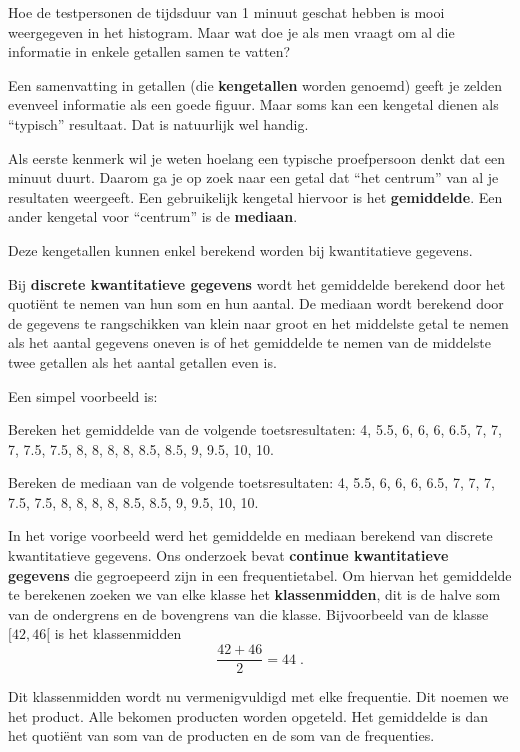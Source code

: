\documentclass[12pt,twoside]{article}
\begin{document}
Hoe de testpersonen de tijdsduur van 1 minuut geschat hebben is mooi weergegeven
in het histogram. Maar wat doe je als men vraagt om al die informatie in enkele
getallen samen te vatten?

Een samenvatting in getallen (die {\bf kengetallen} worden genoemd) geeft je zelden evenveel
informatie als een goede figuur. Maar soms kan een kengetal dienen als “typisch” resultaat. Dat is
natuurlijk wel handig.

Als eerste kenmerk wil je weten hoelang een typische proefpersoon denkt dat een minuut duurt.
Daarom ga je op zoek naar een getal dat “het centrum” van al je resultaten weergeeft. Een
gebruikelijk kengetal hiervoor is het {\bf gemiddelde}. Een ander kengetal voor “centrum” is de
{\bf mediaan}.

Deze kengetallen kunnen enkel berekend worden bij kwantitatieve gegevens.

Bij {\bf discrete kwantitatieve gegevens} wordt het gemiddelde berekend door het quotiënt te nemen van hun som en hun aantal. De mediaan wordt berekend door de gegevens te rangschikken van klein naar groot en het middelste getal te nemen als het aantal gegevens oneven is of het gemiddelde te nemen van de middelste twee getallen als het aantal getallen even is.

Een simpel voorbeeld is:

\begin{oefening}
Bereken het gemiddelde van de volgende toetsresultaten: 4, 5.5, 6, 6, 6, 6.5, 7, 7, 7, 7.5, 7.5, 8, 8, 8, 8, 8.5, 8.5, 9, 9.5, 10, 10.\\
\ruitjes{3cm}
\end{oefening}

\begin{oefening}
Bereken de mediaan van de volgende toetsresultaten: 4, 5.5, 6, 6, 6, 6.5, 7, 7, 7, 7.5, 7.5, 8, 8, 8, 8, 8.5, 8.5, 9, 9.5, 10, 10.\\
\ruitjes{3cm}
\end{oefening}

In het vorige voorbeeld werd het gemiddelde en mediaan berekend van discrete kwantitatieve gegevens. Ons
onderzoek bevat {\bf continue kwantitatieve gegevens} die gegroepeerd zijn in een frequentietabel. Om hiervan
het gemiddelde te berekenen zoeken we van elke klasse het {\bf klassenmidden}, dit is de halve som van de
ondergrens en de bovengrens van die klasse. Bijvoorbeeld van de klasse $[42, 46[$ is het klassenmidden
$$
\frac{42 + 46}{2}=44\;.
$$

Dit klassenmidden wordt nu vermenigvuldigd met elke frequentie. Dit noemen we het product. Alle bekomen producten worden opgeteld. Het gemiddelde is dan het quotiënt van som van de producten en de som van de frequenties.
\newpage
\end{document}
